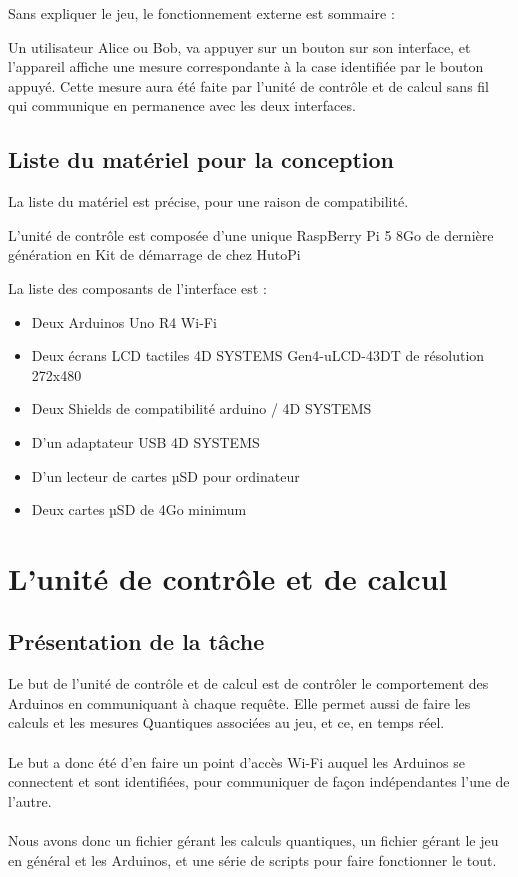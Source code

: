 \documentclass[11pt]{article}
\begin{document}
\noindent Sans expliquer le jeu, le fonctionnement externe est sommaire :

Un utilisateur Alice ou Bob, va appuyer sur un bouton sur son interface, et l'appareil affiche une mesure correspondante à la case identifiée par le bouton appuyé.
Cette mesure aura été faite par l'unité de contrôle et de calcul sans fil qui communique en permanence avec les deux interfaces.


\newpage

\subsection{Liste du matériel pour la conception}

La liste du matériel est précise, pour une raison de compatibilité.

L'unité de contrôle est composée d'une unique RaspBerry Pi 5 8Go de dernière génération en Kit de démarrage de chez HutoPi

La liste des composants de l'interface est :
	\begin{itemize}
		\item Deux Arduinos Uno R4 Wi-Fi
		\item Deux écrans LCD tactiles 4D SYSTEMS Gen4-uLCD-43DT de résolution 272x480
		\item Deux Shields de compatibilité arduino / 4D SYSTEMS
		\item D'un adaptateur USB 4D SYSTEMS
		\item D'un lecteur de cartes µSD pour ordinateur
		\item Deux cartes µSD de 4Go minimum
	\end{itemize}
	
\newpage

\section{L'unité de contrôle et de calcul}

\subsection{Présentation de la tâche}

Le but de l'unité de contrôle et de calcul est de contrôler le comportement des Arduinos en communiquant à chaque requête. Elle permet aussi de faire les calculs et les mesures Quantiques associées au jeu, et ce, en temps réel.
\\
\\
Le but a donc été d'en faire un point d'accès Wi-Fi auquel les Arduinos se connectent et sont identifiées, pour communiquer de façon indépendantes l'une de l'autre.
\\
\\
Nous avons donc un fichier gérant les calculs quantiques, un fichier gérant le jeu en général et les Arduinos, et une série de scripts pour faire fonctionner le tout.
\end{document}
